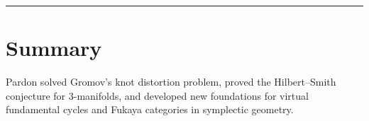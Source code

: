 \begin{center}\rule{0.5\linewidth}{0.5pt}\end{center}

\section*{Summary}

Pardon solved Gromov's knot distortion problem, proved the Hilbert--Smith conjecture for 3-manifolds, and developed new foundations for virtual fundamental cycles and Fukaya categories in symplectic geometry.
